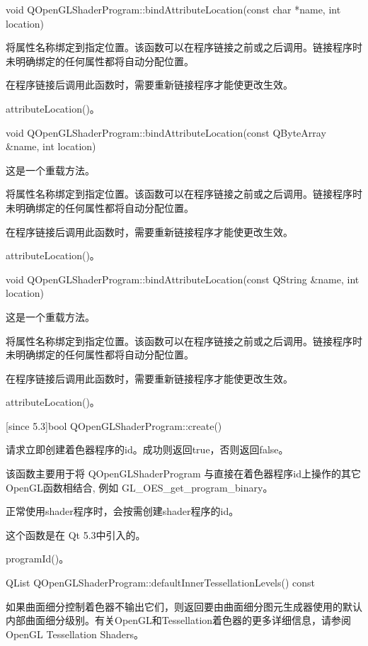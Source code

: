 void QOpenGLShaderProgram::bindAttributeLocation(const char *name, int location)

将属性名称绑定到指定位置。该函数可以在程序链接之前或之后调用。链接程序时未明确绑定的任何属性都将自动分配位置。

在程序链接后调用此函数时，需要重新链接程序才能使更改生效。

\begin{seeAlso}
attributeLocation()。
\end{seeAlso}

void QOpenGLShaderProgram::bindAttributeLocation(const QByteArray \&name, int location)

这是一个重载方法。

将属性名称绑定到指定位置。该函数可以在程序链接之前或之后调用。链接程序时未明确绑定的任何属性都将自动分配位置。

在程序链接后调用此函数时，需要重新链接程序才能使更改生效。

\begin{seeAlso}
attributeLocation()。
\end{seeAlso}

void QOpenGLShaderProgram::bindAttributeLocation(const QString \&name, int location)

这是一个重载方法。

将属性名称绑定到指定位置。该函数可以在程序链接之前或之后调用。链接程序时未明确绑定的任何属性都将自动分配位置。

在程序链接后调用此函数时，需要重新链接程序才能使更改生效。

\begin{seeAlso}
attributeLocation()。
\end{seeAlso}

[since 5.3]bool QOpenGLShaderProgram::create()

请求立即创建着色器程序的id。成功则返回true，否则返回false。

该函数主要用于将 QOpenGLShaderProgram 与直接在着色器程序id上操作的其它OpenGL函数相结合, 例如 GL\_OES\_get\_program\_binary。

正常使用shader程序时，会按需创建shader程序的id。

这个函数是在 Qt 5.3中引入的。

\begin{seeAlso}
programId()。
\end{seeAlso}

QList QOpenGLShaderProgram::defaultInnerTessellationLevels() const

如果曲面细分控制着色器不输出它们，则返回要由曲面细分图元生成器使用的默认内部曲面细分级别。有关OpenGL和Tessellation着色器的更多详细信息，请参阅 OpenGL Tessellation Shaders。

